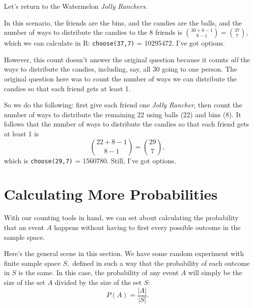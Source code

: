\documentclass[
]{book}
\theoremstyle{definition}
\theoremstyle{definition}
\theoremstyle{definition}
\theoremstyle{definition}
\theoremstyle{remark}
\begin{document}
Let's return to the Watermelon \emph{Jolly Ranchers}.

In this scenario, the friends are the bins, and the candies are the balls, and the number of ways to distribute the candies to the 8 friends is \(\displaystyle \binom{30+8-1}{8-1}=\binom{37}{7},\)
which we can calculate in R: \texttt{choose(37,7)} = 10295472. I've got options.

However, this count doesn't answer the original question because it counts \emph{all} the ways to distribute the candies, including, say, all 30 going to one person. The original question here was to count the number of ways we can distribute the candies so that each friend gets at least 1.

So we do the following: first give each friend one \emph{Jolly Rancher}, then count the number of ways to distribute the remaining 22 using balls (22) and bins (8). It follows that the number of ways to distribute the candies so that each friend gets at least 1 is
\[\binom{22+8-1}{8-1} = \binom{29}{7},\]
which is \texttt{choose(29,7)} = 1560780. Still, I've got options.

\section{Calculating More Probabilities}\label{prob-with-counting-tools}

With our counting tools in hand, we can set about calculating the probability that an event \(A\) happens without having to first every possible outcome in the sample space.

Here's the general scene in this section. We have some random experiment with finite sample space \(S,\) defined in such a way that the probability of each outcome in \(S\) is the same. In this case, the probability of any event \(A\) will simply be the size of the set \(A\) divided by the size of the set \(S\):
\[P(A) = \frac{|A|}{|S|}.\]
\end{document}
